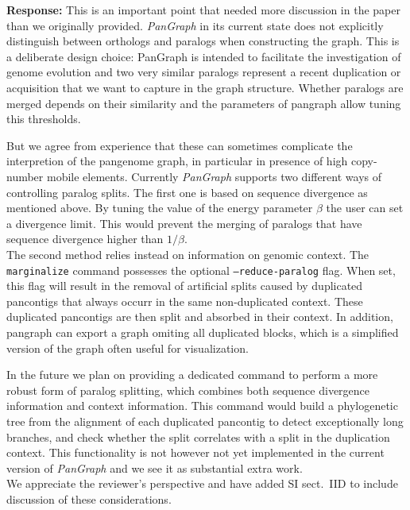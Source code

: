 \documentclass[aps,rmp,onecolumn]{revtex4-1}
\newcommand{\response}[1]{{\it {\color{response}\textbf{Response:} #1}}\vskip 5mm}
\newcommand{\SIalgo}{II}
\begin{document}
\response{
This is an important point that needed more discussion in the paper than we originally provided. 
\textit{PanGraph} in its current state does not explicitly distinguish between orthologs and paralogs when constructing the graph. 
This is a deliberate design choice: PanGraph is intended to facilitate the investigation of genome evolution and two very similar paralogs represent a recent duplication or acquisition that we want to capture in the graph structure. 
Whether paralogs are merged depends on their similarity and the parameters of pangraph allow tuning this thresholds.

But we agree from experience that these can sometimes complicate the interpretion of the pangenome graph, in particular in presence of high copy-number mobile elements.  
Currently \textit{PanGraph} supports two different ways of controlling paralog splits.
The first one is based on sequence divergence as mentioned above.
By tuning the value of the energy parameter $\beta$ the user can set a divergence limit. This would prevent the merging of paralogs that have sequence divergence higher than $1/\beta$.\\
The second method relies instead on information on genomic context. The \texttt{marginalize} command possesses the optional \texttt{--reduce-paralog} flag. 
When set, this flag will result in the removal of artificial splits caused by duplicated pancontigs that always occurr in the same non-duplicated context. 
These duplicated pancontigs are then split and absorbed in their context.
In addition, pangraph can export a graph omiting all duplicated blocks, which is a simplified version of the graph often useful for visualization.

In the future we plan on providing a dedicated command to perform a more robust form of paralog splitting, which combines both sequence divergence information and context information. This command would build a phylogenetic tree from the alignment of each duplicated pancontig to detect exceptionally long branches, and check whether the split correlates with a split in the duplication context. This functionality is not however not yet implemented in the current version of \textit{PanGraph} and we see it as substantial extra work.\\

We appreciate the reviewer's perspective and have added SI sect.~{\SIalgo}D to include discussion of these considerations.

}
\end{document}
